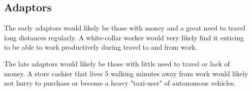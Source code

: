\subsection*{Adaptors}
The early adaptors would likely be those with money and a great need to travel long distances regularly.
A white-collar worker would very likely find it enticing to be able to work productively during travel to and from work.

The late adaptors would likely be those with little need to travel or lack of money.
A store cashier that lives 5 walking minutes away from work would likely not hurry to purchase or become a heavy "taxi-user" of autonomous vehicles.
